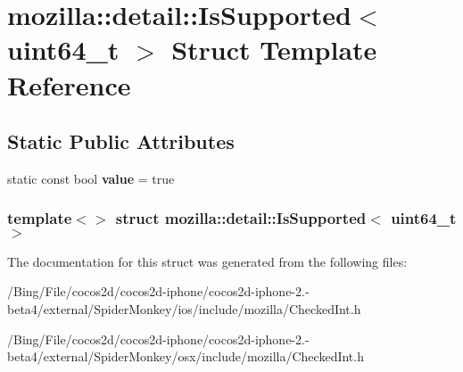 \hypertarget{structmozilla_1_1detail_1_1_is_supported_3_01uint64__t_01_4}{\section{mozilla\-:\-:detail\-:\-:Is\-Supported$<$ uint64\-\_\-t $>$ Struct Template Reference}
\label{structmozilla_1_1detail_1_1_is_supported_3_01uint64__t_01_4}
}
\subsection*{Static Public Attributes}
\begin{DoxyCompactItemize}
\item 
\hypertarget{structmozilla_1_1detail_1_1_is_supported_3_01uint64__t_01_4_a369cfb9ba84a1a152aab9761aa0d78ae}{static const bool {\bfseries value} = true}\label{structmozilla_1_1detail_1_1_is_supported_3_01uint64__t_01_4_a369cfb9ba84a1a152aab9761aa0d78ae}

\end{DoxyCompactItemize}
\subsubsection*{template$<$$>$ struct mozilla\-::detail\-::\-Is\-Supported$<$ uint64\-\_\-t $>$}



The documentation for this struct was generated from the following files\-:\begin{DoxyCompactItemize}
\item 
/\-Bing/\-File/cocos2d/cocos2d-\/iphone/cocos2d-\/iphone-\/2.-\/beta4/external/\-Spider\-Monkey/ios/include/mozilla/Checked\-Int.\-h\item 
/\-Bing/\-File/cocos2d/cocos2d-\/iphone/cocos2d-\/iphone-\/2.-\/beta4/external/\-Spider\-Monkey/osx/include/mozilla/Checked\-Int.\-h\end{DoxyCompactItemize}
